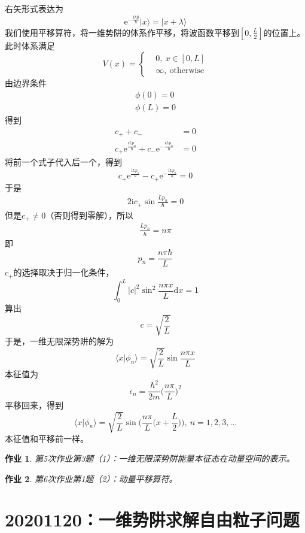 \documentclass[12pt]{article}
\newtheorem{asg}{作业}
\begin{document}
    右矢形式表达为
    \[ \mathrm{e}^{-\frac {\mathrm{i}\lambda \hat{p}}{\hbar}} | x\rangle = |x+\lambda \rangle \]
    我们使用平移算符，将一维势阱的体系作平移，将波函数平移到$[0,\frac L2]$的位置上。此时体系满足
    \begin{equation*}
        V(x) = \left \{
            \begin{aligned}
                &0,\ x\in [0, L]\\
                &\infty, \ \mathrm{otherwise}
            \end{aligned}
            \right.
    \end{equation*}
    由边界条件
    \begin{align*}
        \phi(0)= 0\\
        \phi(L) = 0
    \end{align*}
    得到
    \begin{align*}
        c_+ +c_- &= 0\\
        c_+\mathrm{e}^{\frac {\mathrm{i}Lp_n}{\hbar}}+c_-\mathrm{e}^{-\frac {\mathrm{i}Lp_n}{\hbar}} &= 0
    \end{align*}
    将前一个式子代入后一个，得到
    \[ c_+\mathrm{e}^{\frac {\mathrm{i}Lp_n}{\hbar}}-c_+ \mathrm{e}^{-\frac {\mathrm{i}Lp_n}{\hbar}} = 0 \]
    于是
    \begin{align*}
        2\mathrm{i}c_+ \sin{\frac {Lp_n}{\hbar}} = 0
    \end{align*}
    但是$c_+ \neq 0$（否则得到零解），所以
    \begin{align*}
        \frac {Lp_n}{\hbar} = n\pi
    \end{align*}
    即
    \[ p_n = \frac {n\pi \hbar}{L} \]
    $c_+$的选择取决于归一化条件，
    \[ \int_0^L |c|^2 \sin^2{\frac {n\pi x}L}\mathrm{d}x = 1 \]
    算出
    \[ c = \sqrt{\frac 2L} \]
    于是，一维无限深势阱的解为
    \[ \langle x|\phi_n \rangle = \sqrt{\frac 2L} \sin{\frac {n\pi x}L} \]
    本征值为
    \[ \epsilon_n = \frac {\hbar^2}{2m} \bigg(\frac {n\pi}L\bigg)^2 \]
    平移回来，得到
    \[ \langle x|\phi_n \rangle = \sqrt{\frac 2L} \sin{\bigg(\frac {n\pi}L\bigg(x+\frac L2\bigg)\bigg)}, \ n=1,2,3,... \]
    本征值和平移前一样。
    \begin{asg}
        第5次作业第3题（1）：一维无限深势阱能量本征态在动量空间的表示。
    \end{asg}
    \begin{asg}
        第6次作业第1题（2）：动量平移算符。
    \end{asg}

    \section{20201120：一维势阱求解自由粒子问题}
\end{document}
